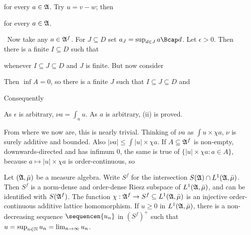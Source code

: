 {\noindent for every $a\in\frak A$.   Try $u=v-w$;  then
     
     
\noindent for every $a\in\frak A$.
     
\medskip
     
\qquad\grheadc\ Now take any $a\in\frak A^f$.   For
$J\subseteq D$ set $a_J=\sup_{d\in J}a\Bcap d$.   Let $\epsilon>0$.
Then there is a finite $I\subseteq D$ such that
     
     
\noindent whenever $I\subseteq J\subseteq D$ and $J$ is finite.   But
now consider
     
     
\noindent Then $\inf A=0$, so there is a finite $J$ such that
$I\subseteq J\subseteq D$ and
     
     
\noindent Consequently
     
     
\noindent As $\epsilon$ is arbitrary, $\nu a=\int_au$.   As $a$ is
arbitrary, (ii) is proved.
     
\medskip
     
 From where we now are, this is nearly
trivial.   Thinking of $\nu a$ as $\int u\times\chi a$, $\nu$ is surely
additive and bounded.   Also $|\nu a|\le\int|u|\times\chi a$.   If
$A\subseteq\frak A^f$ is non-empty, downwards-directed and has infimum
$0$, the same is true of $\{|u|\times\chi a:a\in A\}$, because $a\mapsto
|u|\times\chi a$ is order-continuous, so
     
     
}%
     
 Let $(\frak A,\bar\mu)$ be a measure algebra.
Write $S^f$ for the intersection $S(\frak A)\cap L^1(\frak A,\bar\mu)$.
Then $S^f$ is a norm-dense and order-dense Riesz subspace of
$L^1(\frak A,\bar\mu)$, and can be identified with $S(\frak A^f)$.
The function $\chi:\frak A^f\to S^f\subseteq L^1(\frak A,\bar\mu)$ is an
injective
order-continuous additive lattice homomorphism.   If $u\ge 0$ in
$L^1(\frak A,\bar\mu)$,
there is a non-decreasing sequence $\sequencen{u_n}$ in $(S^f)^+$ such
that $u=\sup_{n\in\Bbb N}u_n=\lim_{n\to\infty}u_n$.
     
